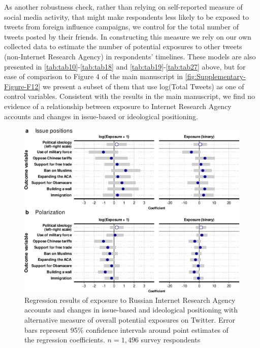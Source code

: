 \documentclass[
  12pt,
]{article}
\begin{document}
As another robustness check, rather than relying on self-reported measure of social media activity, that might make respondents less likely to be exposed to tweets from foreign influence campaigns, we control for the total number of tweets posted by their friends. In constructing this measure we rely on our own collected data to estimate the number of potential exposures to other tweets (non-Internet Research Agency) in respondents' timelines. These models are also presented in \ref{tab:tab10}-\ref{tab:tab18} and \ref{tab:tab19}-\ref{tab:tab27} above, but for ease of comparison to Figure 4 of the main manuscript in \autoref{fig:Supplementary-Figure-F12} we present a subset of them that use log(Total Tweets) as one of control variables. Consistent with the results in the main manuscript, we find no evidence of a relationship between exposure to Internet Research Agency accounts and changes in issue-based or ideological positioning.

\begin{figure}
\centering
\includegraphics{Supplementary_Information_files/figure-latex/Supplementary-Figure-F12-1.pdf}
\caption{\label{fig:Supplementary-Figure-F12}Regression results of exposure to Russian Internet Research Agency accounts and changes in issue-based and ideological positioning with alternative measure of overall potential exposures on Twitter. Error bars represent 95\% confidence intervals around point estimates of the regression coefficients. \(n = 1,496\) survey respondents}
\end{figure}

\clearpage
\end{document}
